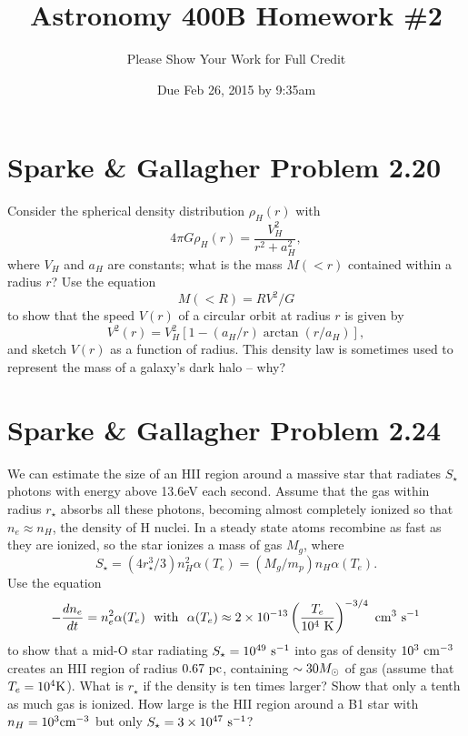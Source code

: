 \documentclass[]{article}
\title{Astronomy 400B Homework \#2}
\author{Please Show Your Work for Full Credit}
\date{Due Feb 26, 2015 by 9:35am}
\begin{document}
\maketitle

\section{Sparke \& Gallagher Problem 2.20}

Consider the spherical density distribution $\rho_H(r)$ with
\begin{equation}
4\pi G\rho_H(r) = \frac{V_H^2}{r^2 +a_H^2},
\end{equation}
where $V_H$ and $a_H$ are constants; what is the mass $M(<r)$ contained within
a radius $r$? Use the equation
\begin{equation}
M(<R) = RV^2/G
\end{equation}
to show that the speed $V(r)$ of a circular orbit at radius $r$
is given by
\begin{equation}
V^2(r) = V_H^2[1-(a_H/r)\arctan(r/a_H)],
\end{equation}
\noindent
and sketch $V(r)$ as a function of radius. This density law is sometimes
used to represent the mass of a galaxy's dark halo -- why?

\section{Sparke \& Gallagher Problem 2.24}

We can estimate the size of an HII region around a massive star that radiates $S_\star$ photons with energy above 13.6eV each second. Assume that the
gas within radius $r_\star$ absorbs all these photons, becoming almost
completely ionized so that $n_e \approx n_H$, the density of H nuclei. In a
steady state atoms recombine as fast as they are ionized, so the star ionizes
a mass of gas $M_g$, where
\begin{equation}
S_\star = (4r_\star^3/3)n_H^2\alpha(T_e) = (M_g/m_p)n_H\alpha(T_e).
\end{equation}
Use the equation
\begin{equation}
-\frac{dn_e}{dt} = n_e^2 \alpha(T_e)~~\mathrm{with}~~\alpha(T_e) \approx 2\times 10^{-13}\left(\frac{T_e}{10^4~\mathrm{K}}\right)^{-3/4}~\mathrm{cm}^3~\mathrm{s}^{-1}
\end{equation}
\noindent
to show that a mid-O star radiating $S_\star=10^{49}~\mathrm{s}^{-1}$ into gas of
density $10^{3}~\mathrm{cm}^{-3}$ creates an HII region of radius $0.67~\mathrm{pc}$,
containing $\sim30M_{\odot}$ of gas (assume that $T_e=10^4\mathrm{K}$). What
is $r_\star$ if the density is ten times larger? Show that only a tenth
as much gas is ionized. How large is the HII region around a B1
star with $n_H=10^3 \mathrm{cm}^{-3}$ but only $S_\star = 3\times10^{47}~\mathrm{s}^{-1}$?
\end{document}
